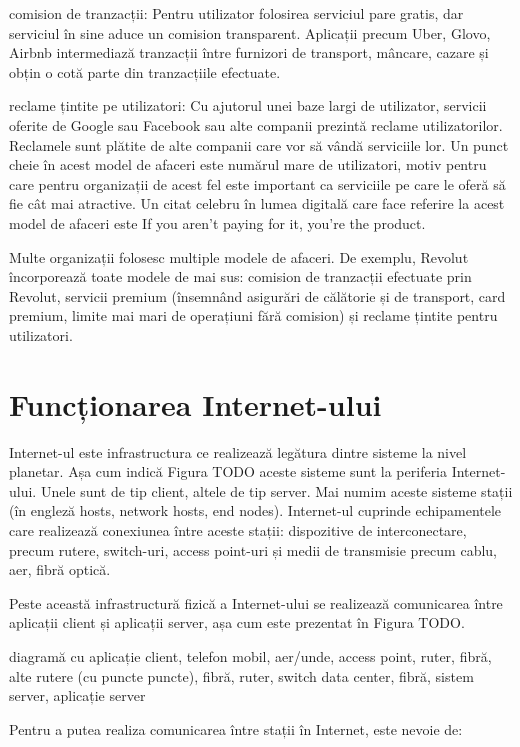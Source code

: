 comision de tranzacții: Pentru utilizator folosirea serviciul pare gratis, dar serviciul în sine aduce un comision transparent. Aplicații precum Uber, Glovo, Airbnb intermediază tranzacții între furnizori de transport, mâncare, cazare și obțin o cotă parte din tranzacțiile efectuate.

reclame țintite pe utilizatori: Cu ajutorul unei baze largi de utilizator, servicii oferite de Google sau Facebook sau alte companii prezintă reclame utilizatorilor. Reclamele sunt plătite de alte companii care vor să vândă serviciile lor. Un punct cheie în acest model de afaceri este numărul mare de utilizatori, motiv pentru care pentru organizații de acest fel este important ca serviciile pe care le oferă să fie cât mai atractive. Un citat celebru în lumea digitală care face referire la acest model de afaceri este If you aren’t paying for it, you’re the product.

Multe organizații folosesc multiple modele de afaceri. De exemplu, Revolut încorporează toate modele de mai sus: comision de tranzacții efectuate prin Revolut, servicii premium (însemnând asigurări de călătorie și de transport, card premium, limite mai mari de operațiuni fără comision) și reclame țintite pentru utilizatori.

\section{Funcționarea Internet-ului}
\label{sec:net:internet}

Internet-ul este infrastructura ce realizează legătura dintre sisteme la nivel planetar. Așa cum indică Figura TODO aceste sisteme sunt la periferia Internet-ului. Unele sunt de tip client, altele de tip server. Mai numim aceste sisteme stații (în engleză hosts, network hosts, end nodes). Internet-ul cuprinde echipamentele care realizează conexiunea între aceste stații: dispozitive de interconectare, precum rutere, switch-uri, access point-uri și medii de transmisie precum cablu, aer, fibră optică.

Peste această infrastructură fizică a Internet-ului se realizează comunicarea între aplicații client și aplicații server, așa cum este prezentat în Figura TODO.

diagramă cu aplicație client, telefon mobil, aer/unde, access point, ruter, fibră, alte rutere (cu puncte puncte), fibră, ruter, switch data center, fibră, sistem server, aplicație server

Pentru a putea realiza comunicarea între stații în Internet, este nevoie de:

